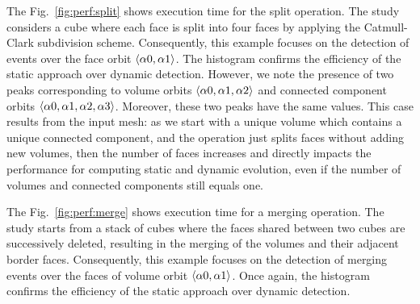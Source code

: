 The Fig.~\ref{fig:perf:split} shows execution time for the split operation. The study considers a cube where each face is split into four faces by applying the  Catmull-Clark subdivision scheme\cite{CATMULL1978350}. Consequently, this example focuses on the detection of events over the face orbit $\langle\alpha 0, \alpha 1\rangle$. The histogram confirms the efficiency of the static approach over dynamic detection. However, we note the presence of two peaks corresponding to volume orbits $\langle\alpha 0,\alpha 1,\alpha 2\rangle$ and connected component orbits $\langle\alpha 0, \alpha 1,\alpha 2,\alpha 3\rangle$. Moreover, these two peaks have the same values.%
This case results from the input mesh: as we start with a unique volume which contains a unique connected component, and the operation just splits faces without adding new volumes, then the number of faces increases and directly impacts the performance for computing static and dynamic evolution, even if the number of volumes and connected components still equals one.

The Fig.~\ref{fig:perf:merge} shows execution time for a merging operation. The study starts from a stack of cubes where the faces shared between two cubes are successively deleted, resulting in the merging of the volumes and their adjacent border faces. Consequently, this example focuses on the detection of merging events over the faces of volume orbit $\langle\alpha 0, \alpha 1\rangle$. Once again, the histogram confirms the efficiency of the static approach over dynamic detection.

